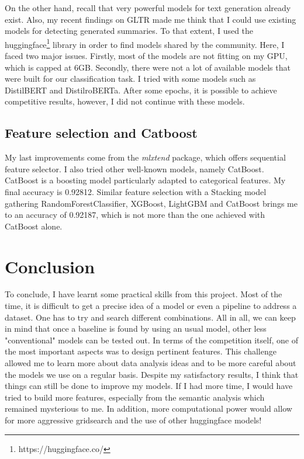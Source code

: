 \documentclass{article}
\begin{document}
\begin{multicols}{2}
On the other hand, recall that very powerful models for text generation already exist. Also, my recent findings on GLTR made me think that I could use existing models for detecting generated summaries. To that extent, I used the huggingface\footnote{https://huggingface.co/} library in order to find models shared by the community. Here, I faced two major issues. Firstly, most of the models are not fitting on my GPU, which is capped at 6GB. Secondly, there were not a lot of available models that were built for our classification task. I tried with some models such as DistilBERT and DistilroBERTa. After some epochs, it is possible to achieve competitive results, however, I did not continue with these models.

\subsection{Feature selection and Catboost}

My last improvements come from the \textit{mlxtend}\cite{mlxtend} package, which offers sequential feature selector. I also tried other well-known models, namely CatBoost\cite{catboost}. CatBoost is a boosting model particularly adapted to categorical features. My final accuracy is 0.92812. Similar feature selection with a Stacking model gathering RandomForestClassifier, XGBoost, LightGBM and CatBoost brings me to an accuracy of 0.92187, which is not more than the one achieved with CatBoost alone.

\section*{Conclusion}

To conclude, I have learnt some practical skills from this project. 
Most of the time, it is difficult to get a precise idea of a model or 
even a pipeline to address a dataset. One has to try and search different 
combinations. All in all, we can keep in mind that once a baseline is found by 
using an usual model, other less "conventional" models can be tested out. 
In terms of the competition itself, one of the most important aspects was to 
design pertinent features. This challenge allowed me to learn more about 
data analysis ideas and to be more careful about the models we use on a regular 
basis. Despite my satisfactory results, I think 
that things can still be done to improve my models. If I had more time, I
would have tried to build more features, especially from the semantic analysis which remained mysterious to me. In addition, more computational power would 
allow for more aggressive gridsearch and the use of other huggingface models!



\end{multicols}
\end{document}
